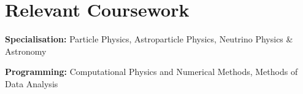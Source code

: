 \section{Relevant Coursework}
  \vspace{2pt}
  \resumeSubHeadingListStart
    \small{\item{
        \textbf{Specialisation:}{ Particle Physics, Astroparticle Physics, Neutrino Physics \& Astronomy} \\ \vspace{1.25pt}
        
        \textbf{Programming:}{ Computational Physics and Numerical Methods, Methods of Data Analysis}
    }}
  \resumeSubHeadingListEnd